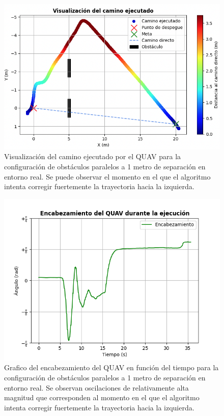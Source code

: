 \begin{figure}[H]
    \centering
    \includegraphics[scale=0.5]{partes/img/real-4-parallelC-2-graph.png}
    \caption[Visualización del camino ejecutado por el QUAV para la configuración de obstáculos paralelos a 1 metro de separación en entorno real.]{Visualización del camino ejecutado por el QUAV para la configuración de obstáculos paralelos a 1 metro de separación en entorno real. Se puede observar el momento en el que el algoritmo intenta corregir fuertemente la trayectoria hacia la izquierda.}
    \label{real-4-parallelC-2-graph}
\end{figure}

\begin{figure}[H]
    \centering
    \includegraphics[scale=0.8]{partes/img/real-4-parallelC-3-yaw.png}
    \caption[Grafico del encabezamiento del QUAV en función del tiempo para la configuración de obstáculos paralelos a 1 metro de separación en entorno real.]{Grafico del encabezamiento del QUAV en función del tiempo para la configuración de obstáculos paralelos a 1 metro de separación en entorno real. Se observan oscilaciones de relativamente alta magnitud que corresponden al momento en el que el algoritmo intenta corregir fuertemente la trayectoria hacia la izquierda.}
    \label{real-4-parallelC-3-yaw}
\end{figure}

